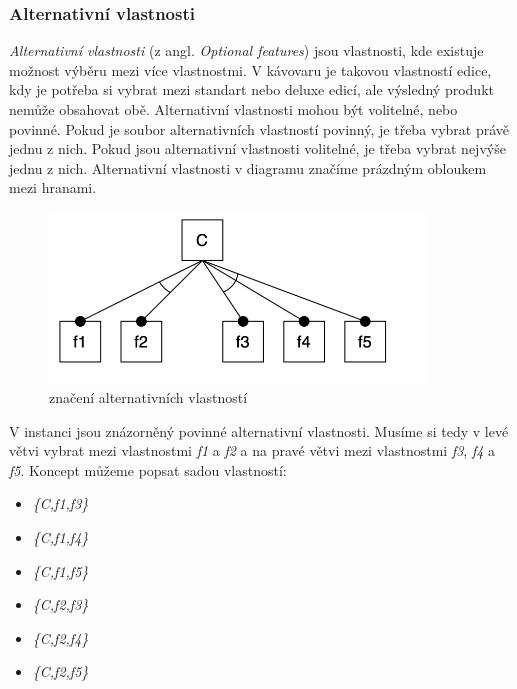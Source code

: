 \subsubsection{Alternativní vlastnosti}
\textit{Alternativní vlastnosti} (z angl. \textit{Optional features}) jsou vlastnosti, kde existuje možnost výběru mezi více vlastnostmi. V kávovaru je takovou vlastností edice, kdy je potřeba si vybrat mezi standart nebo deluxe edicí, ale výsledný produkt nemůže obsahovat obě. Alternativní vlastnosti mohou být volitelné, nebo povinné. Pokud je soubor alternativních vlastností povinný, je třeba vybrat právě jednu z nich. Pokud jsou alternativní vlastnosti volitelné, je třeba vybrat nejvýše jednu z nich.
Alternativní vlastnosti v diagramu značíme prázdným obloukem mezi hranami.
\begin{figure}[H]
	\centering
	\includegraphics[width=10cm]{images/alternative}
	\caption{značení alternativních vlastností}
\end{figure}
V instanci jsou znázorněný povinné alternativní vlastnosti. Musíme si tedy v levé větvi vybrat mezi vlastnostmi \textit{f1} a \textit{f2} a na pravé větvi mezi vlastnostmi \textit{f3}, \textit{f4} a \textit{f5}. Koncept můžeme popsat sadou vlastností:
\begin{itemize}
	\item \textit{\{C,f1,f3\}}
	\item \textit{\{C,f1,f4\}}
	\item \textit{\{C,f1,f5\}}
	\item \textit{\{C,f2,f3\}}
	\item \textit{\{C,f2,f4\}}
	\item \textit{\{C,f2,f5\}}
\end{itemize}


